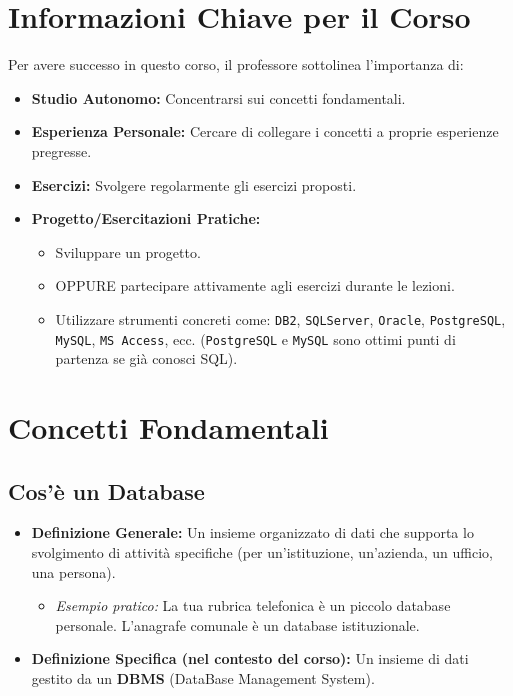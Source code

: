 \section{Informazioni Chiave per il Corso}
Per avere successo in questo corso, il professore sottolinea l'importanza di:
\begin{itemize}
	\item \textbf{Studio Autonomo:} Concentrarsi sui concetti fondamentali.
	\item \textbf{Esperienza Personale:} Cercare di collegare i concetti a proprie esperienze pregresse.
	\item \textbf{Esercizi:} Svolgere regolarmente gli esercizi proposti.
	\item \textbf{Progetto/Esercitazioni Pratiche:}
	\begin{itemize}
		\item Sviluppare un progetto.
		\item OPPURE partecipare attivamente agli esercizi durante le lezioni.
		\item Utilizzare strumenti concreti come: \texttt{DB2}, \texttt{SQLServer}, \texttt{Oracle}, \texttt{PostgreSQL}, \texttt{MySQL}, \texttt{MS Access}, ecc. (\texttt{PostgreSQL} e \texttt{MySQL} sono ottimi punti di partenza se già conosci SQL).
	\end{itemize}
\end{itemize}

\section{Concetti Fondamentali}

\subsection{Cos'è un Database}
\begin{itemize}
	\item \textbf{Definizione Generale:} Un insieme organizzato di dati che supporta lo svolgimento di attività specifiche (per un'istituzione, un'azienda, un ufficio, una persona).
	\begin{itemize}
		\item \textit{Esempio pratico:} La tua rubrica telefonica è un piccolo database personale. L'anagrafe comunale è un database istituzionale.
	\end{itemize}
	\item \textbf{Definizione Specifica (nel contesto del corso):} Un insieme di dati gestito da un \textbf{DBMS} (DataBase Management System).
\end{itemize}


